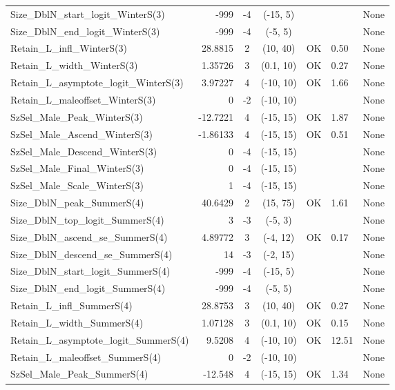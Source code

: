 \documentclass[12pt,]{article}
\begin{document}
\begin{landscape}
\begin{longtable}{lrcccll}
  Size\_DblN\_start\_logit\_WinterS(3) & -999 & -4 & (-15, 5) &  &  & None \\ 
  Size\_DblN\_end\_logit\_WinterS(3) & -999 & -4 & (-5, 5) &  &  & None \\ 
  Retain\_L\_infl\_WinterS(3) & 28.8815 & 2 & (10, 40) & OK & 0.50 & None \\ 
  Retain\_L\_width\_WinterS(3) & 1.35726 & 3 & (0.1, 10) & OK & 0.27 & None \\ 
  Retain\_L\_asymptote\_logit\_WinterS(3) & 3.97227 & 4 & (-10, 10) & OK & 1.66 & None \\ 
  Retain\_L\_maleoffset\_WinterS(3) & 0 & -2 & (-10, 10) &  &  & None \\ 
  SzSel\_Male\_Peak\_WinterS(3) & -12.7221 & 4 & (-15, 15) & OK & 1.87 & None \\ 
  SzSel\_Male\_Ascend\_WinterS(3) & -1.86133 & 4 & (-15, 15) & OK & 0.51 & None \\ 
  SzSel\_Male\_Descend\_WinterS(3) & 0 & -4 & (-15, 15) &  &  & None \\ 
  SzSel\_Male\_Final\_WinterS(3) & 0 & -4 & (-15, 15) &  &  & None \\ 
  SzSel\_Male\_Scale\_WinterS(3) & 1 & -4 & (-15, 15) &  &  & None \\ 
  Size\_DblN\_peak\_SummerS(4) & 40.6429 & 2 & (15, 75) & OK & 1.61 & None \\ 
  Size\_DblN\_top\_logit\_SummerS(4) & 3 & -3 & (-5, 3) &  &  & None \\ 
  Size\_DblN\_ascend\_se\_SummerS(4) & 4.89772 & 3 & (-4, 12) & OK & 0.17 & None \\ 
  Size\_DblN\_descend\_se\_SummerS(4) & 14 & -3 & (-2, 15) &  &  & None \\ 
  Size\_DblN\_start\_logit\_SummerS(4) & -999 & -4 & (-15, 5) &  &  & None \\ 
  Size\_DblN\_end\_logit\_SummerS(4) & -999 & -4 & (-5, 5) &  &  & None \\ 
  Retain\_L\_infl\_SummerS(4) & 28.8753 & 3 & (10, 40) & OK & 0.27 & None \\ 
  Retain\_L\_width\_SummerS(4) & 1.07128 & 3 & (0.1, 10) & OK & 0.15 & None \\ 
  Retain\_L\_asymptote\_logit\_SummerS(4) & 9.5208 & 4 & (-10, 10) & OK & 12.51 & None \\ 
  Retain\_L\_maleoffset\_SummerS(4) & 0 & -2 & (-10, 10) &  &  & None \\ 
  SzSel\_Male\_Peak\_SummerS(4) & -12.548 & 4 & (-15, 15) & OK & 1.34 & None \\ 

\end{longtable}
\end{landscape}
\end{document}
